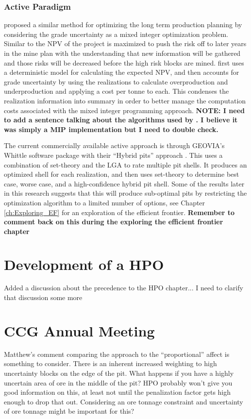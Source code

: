     \subsubsection{Active Paradigm}
        \cite{Koushavand2014a} proposed a similar method for optimizing the long term production planning by considering the grade uncertainty as a mixed integer optimization problem. Similar to \cite{Goodfellow2015} the \gls{NPV} of the project is maximized to push the risk off to later years in the mine plan with the understanding that new information will be gathered and those risks will be decreased before the high risk blocks are mined. \cite{Koushavand2014a} first uses a deterministic model for calculating the expected \gls{NPV}, and then accounts for grade uncertainty by using the realizations to calculate overproduction and underproduction and applying a cost per tonne to each. This condenses the realization information into summary in order to better manage the computation costs associated with the mixed integer programming approach. \textbf{NOTE: I need to add a sentence talking about the algorithms used by \cite{Koushavand2014a}. I believe it was simply a MIP implementation but I need to double check.}

        The current commercially available active approach is through GEOVIA's Whittle software package with their ``Hybrid pits'' approach \citep{Whittle2004}. This uses a combination of set-theory and the \gls{LGA} to rate multiple pit shells. It produces an optimized shell for each realization, and then uses set-theory to determine best case, worse case, and a high-confidence hybrid pit shell. Some of the results later in this research suggests that this will produce sub-optimal pits by restricting the optimization algorithm to a limited number of options, see Chapter \ref{ch:Exploring_EF} for an exploration of the efficient frontier. \textbf{Remember to comment back on this during the exploring the efficient frontier chapter}

\section{Development of a HPO}
    Added a discussion about the precedence to the HPO chapter... I need to clarify that discussion some more

\section{CCG Annual Meeting}
    Matthew's comment comparing the approach to the ``proportional'' affect is something to consider. There is an inherent increased weighting to high uncertainty blocks on the edge of the pit. What happens if you have a highly uncertain area of ore in the middle of the pit? HPO probably won't give you good information on this, at least not until the penalization factor gets high enough to drop that out. Considering an ore tonnage constraint and uncertainty of ore tonnage might be important for this?

